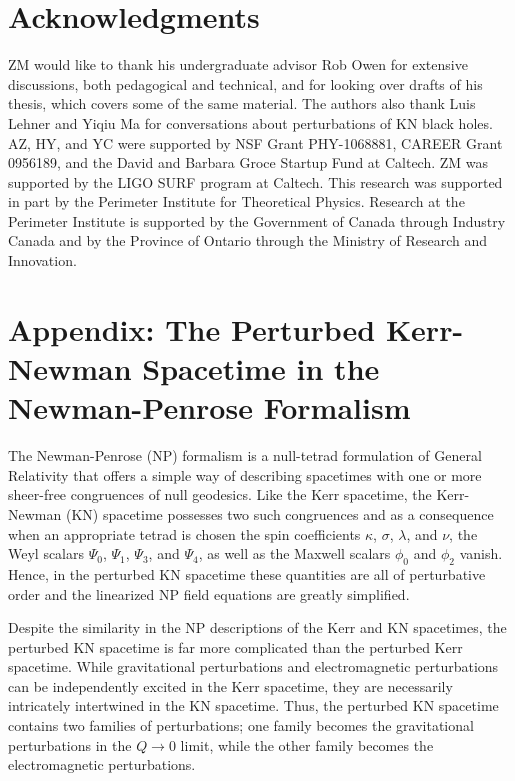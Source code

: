 \begin{refsection}
\section{Acknowledgments}
ZM would like to thank his undergraduate advisor Rob Owen for extensive discussions, both pedagogical and technical, and for looking over drafts of his thesis, which covers some of the same material. The authors also thank Luis Lehner and Yiqiu Ma for conversations about perturbations of KN black holes. AZ, HY, and YC were supported by NSF Grant PHY-1068881, CAREER Grant 0956189, and the David and Barbara Groce Startup Fund at Caltech. ZM was supported by the LIGO SURF program at Caltech. This research was supported in part by the Perimeter Institute for Theoretical Physics. Research at the Perimeter Institute is supported by the Government of Canada through Industry Canada and by the Province of Ontario through the Ministry of Research and Innovation.

\section{Appendix: The Perturbed Kerr-Newman Spacetime in the Newman-Penrose Formalism}

The Newman-Penrose (NP) formalism \cite{ChandraBook, StewartBook, NewmanPenrose1962} is a null-tetrad formulation of General Relativity that offers a simple way of describing spacetimes with one or more sheer-free congruences of null geodesics. Like the Kerr spacetime, the Kerr-Newman (KN) spacetime possesses two such congruences and as a consequence when an appropriate tetrad is chosen the spin coefficients $\kappa$, $\sigma$, $\lambda$, and $\nu$, the Weyl scalars $\Psi_0$, $\Psi_1$, $\Psi_3$, and $\Psi_4$, as well as the Maxwell scalars $\phi_0$ and $\phi_2$ vanish. Hence, in the perturbed KN spacetime these quantities are all of perturbative order and the linearized NP field equations are greatly simplified.  

Despite the similarity in the NP descriptions of the Kerr and KN spacetimes, the perturbed KN spacetime is far more complicated than the perturbed Kerr spacetime. 
While gravitational perturbations and electromagnetic perturbations can be independently excited in the Kerr spacetime, they are necessarily intricately intertwined in the KN spacetime. 
Thus, the perturbed KN spacetime contains two families of perturbations; one family becomes the gravitational perturbations in the $Q \to 0$ limit, while the other family becomes the electromagnetic perturbations. 


\end{refsection}
